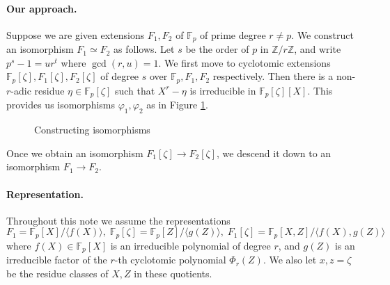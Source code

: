 \documentclass[12pt]{article}
\theoremstyle{plain}
\theoremstyle{definition}
\def\F{\mathbb{F}}
\begin{document}
\paragraph{Our approach.} Suppose we are given extensions $F_1, F_2$ of $\F_p$ of prime degree $r \ne p$. We construct an isomorphism $F_1 \simeq F_2$ as follows. Let $s$ be the order of $p$ in $\mathbb{Z} / r\mathbb{Z}$, and write $p^s - 1 = ur^t$ where $\gcd(r, u) = 1$. We first move to cyclotomic extensions $\F_p[\zeta], F_1[\zeta], F_2[\zeta]$ of degree $s$ over $\F_p, F_1, F_2$ respectively. Then there is a non-$r$-adic residue $\eta \in \F_p[\zeta]$ such that $X^r - \eta$ is irreducible in $\F_p[\zeta][X]$. This provides us isomorphisms $\varphi_1, \varphi_2$ as in Figure \ref{figure:our-approach}.
\begin{figure}
\label{figure:our-approach}
	\begin{center}
		\caption{Constructing isomorphisms}
	\end{center}
\end{figure}
Once we obtain an isomorphism $F_1[\zeta] \rightarrow F_2[\zeta]$, we descend it down to an isomorphism $F_1 \rightarrow F_2$.

\paragraph{Representation.} Throughout this note we assume the representations
\begin{equation}
\label{equation:rep}
	F_1 = \F_p[X] / \langle f(X) \rangle, \; \F_p[\zeta] = \F_p[Z] / \langle g(Z) \rangle, \;
	F_1[\zeta] = \F_p[X, Z] / \langle f(X), g(Z) \rangle
\end{equation}
where $f(X) \in \F_p[X]$ is an irreducible polynomial of degree $r$, and $g(Z)$ is an irreducible factor of the $r$-th cyclotomic polynomial $\Phi_r(Z)$. We also let $x, z = \zeta$ be the residue classes of $X, Z$ in these quotients.
\end{document}
